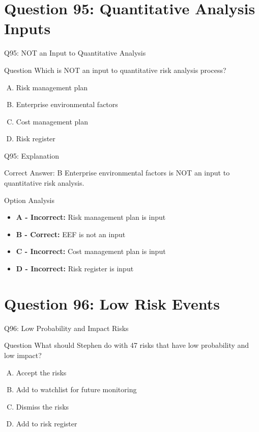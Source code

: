 \documentclass{beamer}
\begin{document}
	\section{Question 95: Quantitative Analysis Inputs}
	
	\begin{frame}{Q95: NOT an Input to Quantitative Analysis}
		\begin{block}{Question}
			Which is NOT an input to quantitative risk analysis process?
		\end{block}
		\begin{enumerate}[(A)]
			\item Risk management plan
			\item Enterprise environmental factors
			\item Cost management plan
			\item Risk register
		\end{enumerate}
	\end{frame}
	
	\begin{frame}{Q95: Explanation}
		\begin{block}{Correct Answer: B}
			Enterprise environmental factors is NOT an input to quantitative risk analysis.
		\end{block}
		\begin{block}{Option Analysis}
			\begin{itemize}
				\item \textbf{A - Incorrect:} Risk management plan is input
				\item \textbf{B - Correct:} EEF is not an input
				\item \textbf{C - Incorrect:} Cost management plan is input
				\item \textbf{D - Incorrect:} Risk register is input
			\end{itemize}
		\end{block}
	\end{frame}
	
	\section{Question 96: Low Risk Events}
	
	\begin{frame}{Q96: Low Probability and Impact Risks}
		\begin{block}{Question}
			What should Stephen do with 47 risks that have low probability and low impact?
		\end{block}
		\begin{enumerate}[(A)]
			\item Accept the risks
			\item Add to watchlist for future monitoring
			\item Dismiss the risks
			\item Add to risk register
		\end{enumerate}
	\end{frame}
	
\end{document}
